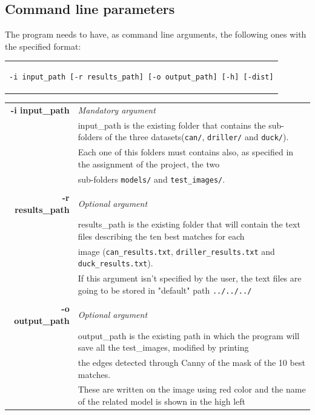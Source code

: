\documentclass{article}
\begin{document}
\subsection{Command line parameters}\label{args}
The program needs to have, as command line arguments, the following ones with the specified format:
\begin{center}
\begin{tabular}{c}
\begin{lstlisting}[linewidth=320pt, basicstyle=\footnotesize\sffamily,]
-i input_path [-r results_path] [-o output_path] [-h] [-dist]
\end{lstlisting}
\end{tabular}
\end{center}
\begin{table}[H]
\footnotesize\centering
\begin{tabular}{rl}
\textbf{-i input\_path} & {\textit{Mandatory argument}}\\
& {input\_path is the existing folder that contains the sub-folders of the three datasets(\texttt{can/}, \texttt{driller/} and \texttt{duck/})}.\\
& {Each one of this folders must contains also, as specified in the assignment of the project, the two}\\
&{sub-folders \texttt{models/} and \texttt{test\_images/}.}\\
&\\
\textbf{-r results\_path} & {\textit{Optional argument}}\\
& {results\_path is the existing folder that will contain the text files describing the ten best matches for each}\\
& {image (\texttt{can\_results.txt}, \texttt{driller\_results.txt} and \texttt{duck\_results.txt}).}\\
& {If this argument isn't specified by the user, the text files are going to be stored in "default" path \texttt{../../../}}\\
&\\
\textbf{-o output\_path} & {\textit{Optional argument}}\\
& {output\_path is the existing path in which the program will save all the test\_images, modified by printing}\\
&{the edges detected through Canny of the mask of the 10 best matches.}\\
&{These are written on the image using red color and the name of the related model is shown in the high left }\\

\end{tabular}
\end{table}
\end{document}
